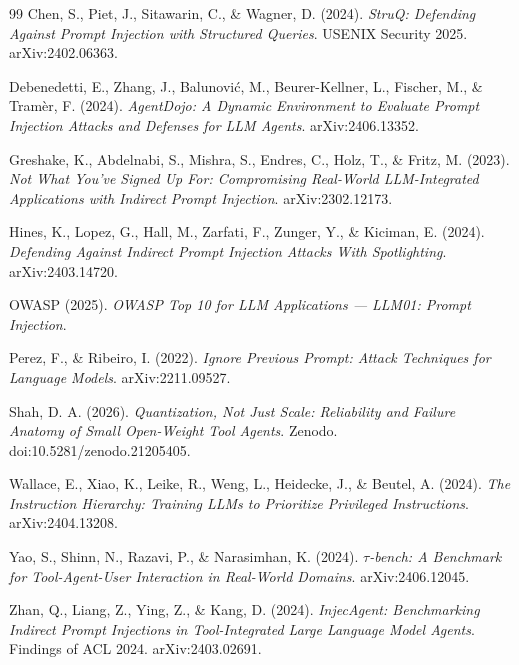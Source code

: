 \documentclass[11pt]{article}
\begin{document}
\begin{thebibliography}{99}
\small
{} Chen, S., Piet, J., Sitawarin, C., \& Wagner,
D. (2024). \emph{StruQ: Defending Against Prompt Injection with Structured
Queries}. USENIX Security 2025. arXiv:2402.06363.

 Debenedetti, E., Zhang, J.,
Balunovi\'c, M., Beurer-Kellner, L., Fischer, M., \& Tram\`er, F. (2024).
\emph{AgentDojo: A Dynamic Environment to Evaluate Prompt Injection Attacks and
Defenses for LLM Agents}. arXiv:2406.13352.

 Greshake, K., Abdelnabi, S., Mishra,
S., Endres, C., Holz, T., \& Fritz, M. (2023). \emph{Not What You've Signed Up For:
Compromising Real-World LLM-Integrated Applications with Indirect Prompt
Injection}. arXiv:2302.12173.

 Hines, K., Lopez, G., Hall, M., Zarfati,
F., Zunger, Y., \& Kiciman, E. (2024). \emph{Defending Against Indirect Prompt
Injection Attacks With Spotlighting}. arXiv:2403.14720.

 OWASP (2025). \emph{OWASP Top 10 for LLM
Applications --- LLM01: Prompt Injection}.

 Perez, F., \& Ribeiro, I. (2022).
\emph{Ignore Previous Prompt: Attack Techniques for Language Models}.
arXiv:2211.09527.

 Shah, D. A. (2026). \emph{Quantization, Not Just Scale:
Reliability and Failure Anatomy of Small Open-Weight Tool Agents}. Zenodo.
doi:10.5281/zenodo.21205405.

 Wallace, E., Xiao, K., Leike, R., Weng,
L., Heidecke, J., \& Beutel, A. (2024). \emph{The Instruction Hierarchy: Training
LLMs to Prioritize Privileged Instructions}. arXiv:2404.13208.

 Yao, S., Shinn, N., Razavi, P., \& Narasimhan,
K. (2024). \emph{$\tau$-bench: A Benchmark for Tool-Agent-User Interaction in
Real-World Domains}. arXiv:2406.12045.

 Zhan, Q., Liang, Z., Ying, Z., \& Kang, D.
(2024). \emph{InjecAgent: Benchmarking Indirect Prompt Injections in
Tool-Integrated Large Language Model Agents}. Findings of ACL 2024.
arXiv:2403.02691.
\end{thebibliography}
\end{document}
